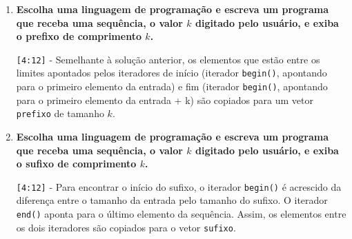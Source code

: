 \begin{enumerate}
	\pagebreak
	\item \textbf{Escolha uma linguagem de programação e escreva um programa que receba	uma sequência, o valor $k$ digitado pelo usuário, e exiba o prefixo de comprimento $k$.}
	
	\verb|[4:12]| - Semelhante à solução anterior, os elementos que estão entre os limites apontados pelos iteradores de início (iterador \verb|begin()|, apontando para o primeiro elemento da entrada) e fim (iterador \verb|begin()|, apontando para o primeiro elemento da entrada + k) são copiados para um vetor \verb|prefixo| de tamanho $k$.
	
	\pagebreak
	\item \textbf{Escolha uma linguagem de programação e escreva um programa que receba	uma sequência, o valor $k$ digitado pelo usuário, e exiba o sufixo de comprimento $k$.}
	
	\verb|[4:12]| - Para encontrar o início do sufixo, o iterador \verb|begin()| é acrescido da diferença entre o tamanho da entrada pelo tamanho do sufixo. O iterador \verb|end()| aponta para o último elemento da sequência. Assim, os elementos entre os dois iteradores são copiados para o vetor \verb|sufixo|.
	
\end{enumerate}